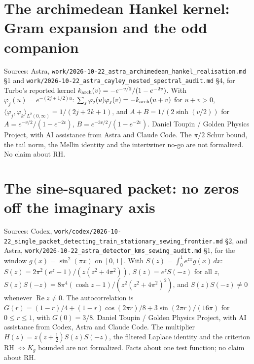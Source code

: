 \documentclass{report}
\theoremstyle{definition}
\begin{document}
\begin{itemize}
\begin{itemize}
\section{The archimedean Hankel kernel: Gram expansion and the odd companion}
Sources: Astra, \texttt{work/2026-10-22\_astra\_archimedean\_hankel\_realisation.md} \S1 and \texttt{work/2026-10-22\_astra\_cayley\_nested\_spectral\_audit.md}
\S4, for Turbo's reported kernel $k_{\rm arch}(v)=-e^{-v/2}/(1-e^{-2v})$. With $\varphi_j(u)=e^{-(2j+1/2)u}$: $\sum_j\varphi_j(u)\varphi_j(v)=-k_{\rm arch}(u+v)$ for $u+v>0$,
$\langle\varphi_j,\varphi_k\rangle_{L^2(0,\infty)}=1/(2j+2k+1)$, and $A+B=1/(2\sinh(v/2))$ for $A=e^{-v/2}/(1-e^{-2v})$, $B=e^{-3v/2}/(1-e^{-2v})$. Daniel Toupin /
Golden Physics Project, with AI assistance from Astra and Claude Code. The $\pi/2$ Schur bound, the tail norm, the Mellin identity and the intertwiner
no-go are not formalized. No claim about RH.

\section{The sine-squared packet: no zeros off the imaginary axis}
Sources: Codex, \texttt{work/codex/2026-10-22\_single\_packet\_detecting\_train\_stationary\_sewing\_frontier.md} \S2, and Astra,
\texttt{work/2026-10-22\_astra\_detector\_kms\_sewing\_audit.md} \S1, for the window $g(x)=\sin^2(\pi x)$ on $[0,1]$. With $S(z)=\int_0^1e^{zx}g(x)\,dx$:
$S(z)=2\pi^2(e^z-1)/(z(z^2+4\pi^2))$, $S(z)=e^zS(-z)$ for all $z$, $S(z)S(-z)=8\pi^4(\cosh z-1)/(z^2(z^2+4\pi^2)^2)$, and $S(z)S(-z)\neq0$ whenever
$\operatorname{Re}z\neq0$. The autocorrelation is $G(r)=(1-r)/4+(1-r)\cos(2\pi r)/8+3\sin(2\pi r)/(16\pi)$ for $0\le r\le1$, with $G(0)=3/8$. Daniel Toupin /
Golden Physics Project, with AI assistance from Codex, Astra and Claude Code. The multiplier $H(z)=z(z+\tfrac12)S(z)S(-z)$, the filtered Laplace identity
and the criterion RH $\Leftrightarrow K_g$ bounded are not formalized. Facts about one test function; no claim about RH.


\end{itemize}
\end{itemize}
\end{document}
